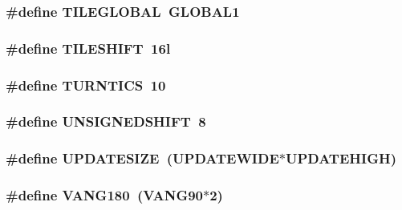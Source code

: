 \label{WL__DEF_8H_afff7252a9dd76a715fc4d5f0e20db4f2}
\hypertarget{WL__DEF_8H_a8efa5750119f7544ae4805544b79fe69}{
\subsubsection[{TILEGLOBAL}]{\setlength{\rightskip}{0pt plus 5cm}\#define TILEGLOBAL~GLOBAL1}}
\label{WL__DEF_8H_a8efa5750119f7544ae4805544b79fe69}
\hypertarget{WL__DEF_8H_aebe7c3b3694edef9f6613e72afb57bbd}{
\subsubsection[{TILESHIFT}]{\setlength{\rightskip}{0pt plus 5cm}\#define TILESHIFT~16l}}
\label{WL__DEF_8H_aebe7c3b3694edef9f6613e72afb57bbd}
\hypertarget{WL__DEF_8H_a3560ebb2d77ef921d3a5af7d8943776d}{
\subsubsection[{TURNTICS}]{\setlength{\rightskip}{0pt plus 5cm}\#define TURNTICS~10}}
\label{WL__DEF_8H_a3560ebb2d77ef921d3a5af7d8943776d}
\hypertarget{WL__DEF_8H_ac7445643f48ab24cb2d602cfecbb080b}{
\subsubsection[{UNSIGNEDSHIFT}]{\setlength{\rightskip}{0pt plus 5cm}\#define UNSIGNEDSHIFT~8}}
\label{WL__DEF_8H_ac7445643f48ab24cb2d602cfecbb080b}
\hypertarget{WL__DEF_8H_a4e37b37b42e7cf06336dc2c4eb7630db}{
\subsubsection[{UPDATESIZE}]{\setlength{\rightskip}{0pt plus 5cm}\#define UPDATESIZE~(UPDATEWIDE$\ast$UPDATEHIGH)}}
\label{WL__DEF_8H_a4e37b37b42e7cf06336dc2c4eb7630db}
\hypertarget{WL__DEF_8H_aa2bdc31689ba84852e8b9bc72e8c3d23}{
\subsubsection[{VANG180}]{\setlength{\rightskip}{0pt plus 5cm}\#define VANG180~(VANG90$\ast$2)}}
